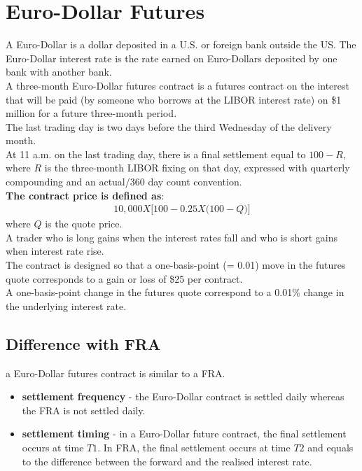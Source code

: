 \section{Euro-Dollar Futures}
A Euro-Dollar is a dollar deposited in a U.S. or foreign bank outside the US. The Euro-Dollar interest rate is the rate earned on Euro-Dollars deposited by one bank with another bank.\\
A three-month Euro-Dollar futures contract is a futures contract on the interest that will be paid (by someone who borrows at the LIBOR interest rate) on \$1 million for a future three-month period.\\
The last trading day is two days before the third Wednesday of the delivery month.\\
At 11 a.m. on the last trading day, there is a final settlement equal to $100 - R$, where $R$ is the three-month LIBOR fixing on that day, expressed with quarterly compounding and an actual/360 day count convention.\\
\textbf{\color{blue}The contract price is defined as}:
\begin{eqnarray}
	10,000 X \Big[100 - 0.25 X \big(100 - Q\big)\Big]
\end{eqnarray}
where $Q$ is the quote price.\\
A trader who is long gains when the interest rates fall and who is short gains when interest rate rise.\\
The contract is designed so that a one-basis-point (= 0.01) move in the futures quote corresponds to a gain or loss of \$25 per contract.\\
A one-basis-point change in the futures quote correspond to a 0.01\% change in the underlying interest rate.


\subsection{Difference with FRA}
a Euro-Dollar futures contract is similar to a FRA.
\begin{itemize}
	\item \textbf{\color{blue}settlement frequency} - the Euro-Dollar contract is settled daily whereas the FRA is not settled daily.
	\item \textbf{\color{blue}settlement timing} - in a Euro-Dollar future contract, the final settlement occurs at time $T1$. In FRA, the final settlement occurs at time $T2$ and equals to the difference between the forward and the realised interest rate.
\end{itemize}

